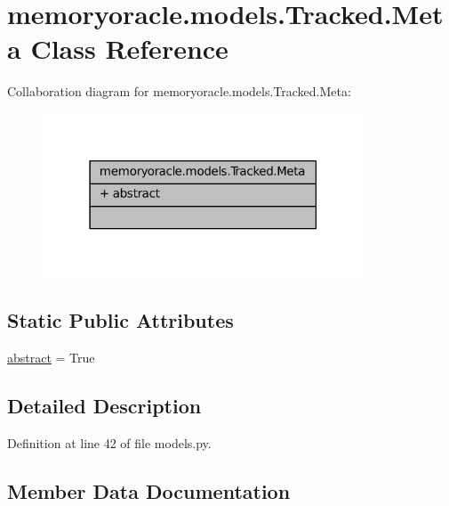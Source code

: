 \hypertarget{classmemoryoracle_1_1models_1_1Tracked_1_1Meta}{}\section{memoryoracle.\+models.\+Tracked.\+Meta Class Reference}
\label{classmemoryoracle_1_1models_1_1Tracked_1_1Meta}


Collaboration diagram for memoryoracle.\+models.\+Tracked.\+Meta\+:\nopagebreak
\begin{figure}[H]
\begin{center}
\leavevmode
\includegraphics[width=271pt]{classmemoryoracle_1_1models_1_1Tracked_1_1Meta__coll__graph}
\end{center}
\end{figure}
\subsection*{Static Public Attributes}
\begin{DoxyCompactItemize}
\item 
\hyperlink{classmemoryoracle_1_1models_1_1Tracked_1_1Meta_aca9b8e599664f262b2cca127c3c11d3e}{abstract} = True
\end{DoxyCompactItemize}


\subsection{Detailed Description}


Definition at line 42 of file models.\+py.



\subsection{Member Data Documentation}
\hypertarget{classmemoryoracle_1_1models_1_1Tracked_1_1Meta_aca9b8e599664f262b2cca127c3c11d3e}{}
